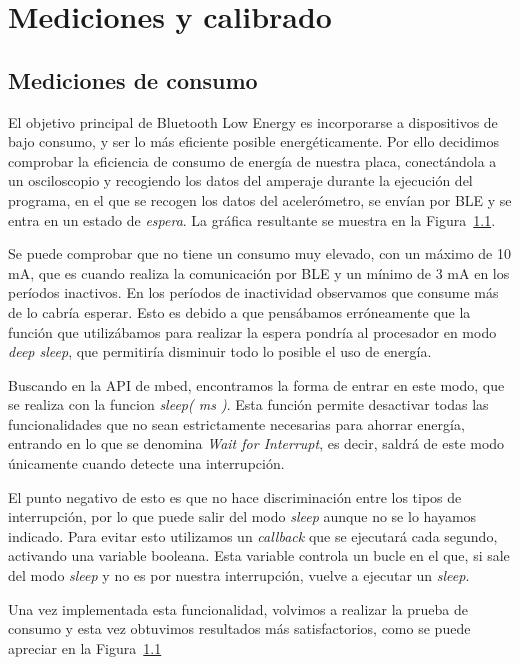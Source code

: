 \cleardoublepage

\chapter{Mediciones y calibrado}
\label{makereference7}

\section{Mediciones de consumo}

El objetivo principal de Bluetooth Low Energy es incorporarse a dispositivos de bajo consumo, y ser lo más eficiente posible energéticamente. Por ello decidimos comprobar la eficiencia de consumo de energía de nuestra placa, conectándola a un osciloscopio y recogiendo los datos del amperaje durante la ejecución del programa, en el que se recogen los datos del acelerómetro, se envían por BLE y se entra en un estado de \textit{espera}. La gráfica resultante se muestra en la Figura~\ref{}.


Se puede comprobar que no tiene un consumo muy elevado, con un máximo de 10 mA, que es cuando realiza la comunicación por BLE y un mínimo de 3 mA en los períodos inactivos. En los períodos de inactividad observamos que consume más de lo cabría esperar. Esto es debido a que pensábamos erróneamente que la función que utilizábamos para realizar la espera pondría al procesador en modo \textit{deep sleep}, que permitiría disminuir todo lo posible el uso de energía.

Buscando en la API de mbed, encontramos la forma de entrar en este modo, que se realiza con la funcion \textit{sleep( ms )}. Esta función permite desactivar todas las funcionalidades que no sean estrictamente necesarias para ahorrar energía, entrando en lo que se denomina \textit{Wait for Interrupt}, es decir, saldrá de este modo únicamente cuando detecte una interrupción. 

El punto negativo de esto es que no hace discriminación entre los tipos de interrupción, por lo que puede salir del modo \textit{sleep} aunque no se lo hayamos indicado. Para evitar esto utilizamos un \textit{callback} que se ejecutará cada segundo, activando una variable booleana. Esta variable controla un bucle en el que, si sale del modo \textit{sleep} y no es por nuestra interrupción, vuelve a ejecutar un \textit{sleep}.

Una vez implementada esta funcionalidad, volvimos a realizar la prueba de consumo y esta vez obtuvimos resultados más satisfactorios, como se puede apreciar en la Figura~\ref{}

